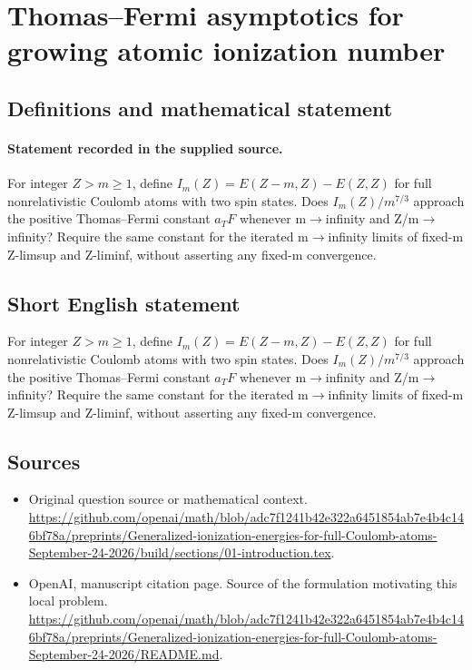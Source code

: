 \documentclass[11pt]{article}
\begin{document}
\section*{Thomas–Fermi asymptotics for growing atomic ionization number}\label{statement}
\subsection{Definitions and mathematical statement}
\paragraph{Statement recorded in the supplied source.}
For integer $Z>m\geq 1$, define $I_m(Z)=E(Z-m,Z)-E(Z,Z)$ for full nonrelativistic Coulomb atoms with two spin states. Does $I_m(Z)/m^{7/3}$ approach the positive Thomas–Fermi constant $a_TF$ whenever m$\to$infinity and Z/m$\to$infinity? Require the same constant for the iterated m$\to$infinity limits of fixed-m Z-limsup and Z-liminf, without asserting any fixed-m convergence.
\subsection{Short English statement}
For integer $Z>m\geq 1$, define $I_m(Z)=E(Z-m,Z)-E(Z,Z)$ for full nonrelativistic Coulomb atoms with two spin states. Does $I_m(Z)/m^{7/3}$ approach the positive Thomas–Fermi constant $a_TF$ whenever m$\to$infinity and Z/m$\to$infinity? Require the same constant for the iterated m$\to$infinity limits of fixed-m Z-limsup and Z-liminf, without asserting any fixed-m convergence.
\subsection{Sources}
\begin{itemize}
\item[S1] Original question source or mathematical context.
\url{https://github.com/openai/math/blob/adc7f1241b42e322a6451854ab7e4b4c146bf78a/preprints/Generalized-ionization-energies-for-full-Coulomb-atoms-September-24-2026/build/sections/01-introduction.tex}.
\item[S2] OpenAI, manuscript citation page. Source of the formulation motivating this local problem.
\url{https://github.com/openai/math/blob/adc7f1241b42e322a6451854ab7e4b4c146bf78a/preprints/Generalized-ionization-energies-for-full-Coulomb-atoms-September-24-2026/README.md}.
\end{itemize}
\end{document}
